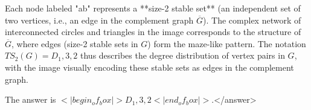 Each node labeled "ab" represents a **size-2 stable set** (an independent set of two vertices, i.e., an edge in the complement graph \( \overline{G} \)). The complex network of interconnected circles and triangles in the image corresponds to the structure of \( \overline{G} \), where edges (size-2 stable sets in \( G \)) form the maze-like pattern. The notation \( TS_2(G) = D_1,3,2 \) thus describes the degree distribution of vertex pairs in \( G \), with the image visually encoding these stable sets as edges in the complement graph.  

The answer is \(<|begin_of_box|>D_1,3,2<|end_of_box|>\).</answer>